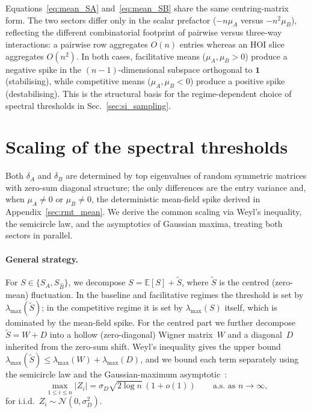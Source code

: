 \documentclass[pdflatex,sn-mathphys-num]{sn-jnl}%
\newcommand{\bone}{\mathbf{1}}
\begin{document}
\begin{appendices}
Equations~\eqref{eq:mean_SA} and~\eqref{eq:mean_SB} share the same centring-matrix form. The two sectors differ only in the scalar prefactor ($-n\mu_A$ versus $-n^2\mu_B$), reflecting the different combinatorial footprint of pairwise versus three-way interactions: a pairwise row aggregates $O(n)$ entries whereas an HOI slice aggregates $O(n^2)$. In both cases, facilitative means ($\mu_A, \mu_B > 0$) produce a negative spike in the $(n{-}1)$-dimensional subspace orthogonal to $\bone$ (stabilising), while competitive means ($\mu_A, \mu_B < 0$) produce a positive spike (destabilising). This is the structural basis for the regime-dependent choice of spectral thresholds in Sec.~\ref{sec:si_sampling}.

\section{Scaling of the spectral thresholds}\label{sec:rmt}

Both $\delta_A$ and $\delta_B$ are determined by top eigenvalues of random symmetric matrices with zero-sum diagonal structure; the only differences are the entry variance and, when $\mu_A \neq 0$ or $\mu_B \neq 0$, the deterministic mean-field spike derived in Appendix~\ref{sec:rmt_mean}. We derive the common scaling via Weyl's inequality, the semicircle law, and the asymptotics of Gaussian maxima, treating both sectors in parallel.

\paragraph{General strategy.} For $S \in \{S_A, S_{\hat{B}}\}$, we decompose $S = \mathbb{E}[S] + \tilde{S}$, where $\tilde{S}$ is the centred (zero-mean) fluctuation. In the baseline and facilitative regimes the threshold is set by $\lambda_{\max}(\tilde{S})$; in the competitive regime it is set by $\lambda_{\max}(S)$ itself, which is dominated by the mean-field spike. For the centred part we further decompose $\tilde{S} = W + D$ into a hollow (zero-diagonal) Wigner matrix~$W$ and a diagonal~$D$ inherited from the zero-sum shift. Weyl's inequality gives the upper bound $\lambda_{\max}(\tilde{S}) \leq \lambda_{\max}(W) + \lambda_{\max}(D)$, and we bound each term separately using the semicircle law and the Gaussian-maximum asymptotic~\cite{leadbetter_extremes_1983}:
\begin{equation}\label{eq:gauss_max}
\max_{1 \leq i \leq n} |Z_i| = \sigma_D\sqrt{2\log n}\,(1 + o(1)) \qquad \text{a.s.\ as } n \to \infty,
\end{equation}
for i.i.d.\ $Z_i \sim \mathcal{N}(0, \sigma_D^2)$.


\end{appendices}
\end{document}

